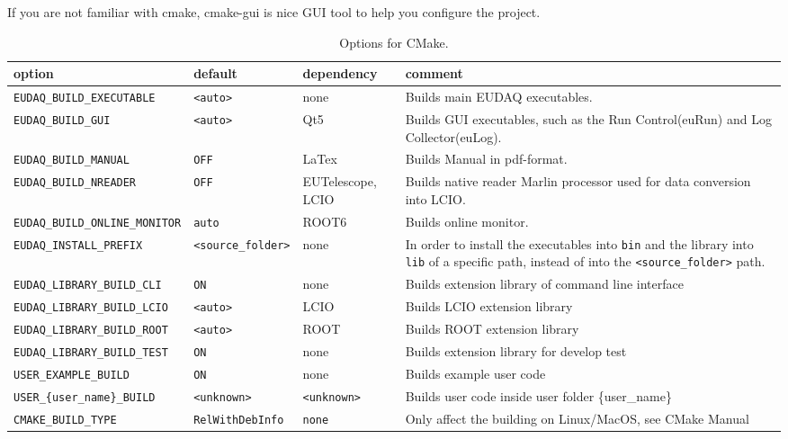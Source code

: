 If you are not familiar with cmake, cmake-gui is nice GUI tool to help you configure the project.

\begin{table}[!h]
{\footnotesize
\begin{tabular}{l|l|p{2cm}|p{5.5cm}}
option &  default &  dependency & comment \\
\hline
\texttt{EUDAQ\_BUILD\_EXECUTABLE} &  \texttt{<auto>} & none & Builds main EUDAQ executables.\\
\texttt{EUDAQ\_BUILD\_GUI} & \texttt{<auto>} & Qt5 & Builds GUI executables, such as the Run Control(euRun) and Log Collector(euLog).\\
\texttt{EUDAQ\_BUILD\_MANUAL} & \texttt{OFF} & LaTex &  Builds Manual in pdf-format.  \\
\texttt{EUDAQ\_BUILD\_NREADER} & \texttt{OFF} & EUTelescope, LCIO &  Builds native reader Marlin processor used for data conversion into LCIO.\\
\texttt{EUDAQ\_BUILD\_ONLINE\_MONITOR} & \texttt{auto} & ROOT6 &  Builds online monitor.  \\
\texttt{EUDAQ\_INSTALL\_PREFIX} & \texttt{<source\_folder>} & none & In order to install the executables into \texttt{bin} and the library into \texttt{lib} of a specific path, instead of into the \texttt{<source\_folder>} path.\\
\texttt{EUDAQ\_LIBRARY\_BUILD\_CLI} & \texttt{ON} & none & Builds extension library of command line interface\\
\texttt{EUDAQ\_LIBRARY\_BUILD\_LCIO} & \texttt{<auto>} & LCIO & Builds LCIO extension library\\
\texttt{EUDAQ\_LIBRARY\_BUILD\_ROOT} & \texttt{<auto>} & ROOT & Builds ROOT extension library\\
\texttt{EUDAQ\_LIBRARY\_BUILD\_TEST} & \texttt{ON} & none & Builds extension library for develop test\\
\texttt{USER\_EXAMPLE\_BUILD} & \texttt{ON} & none & Builds example user code\\
\texttt{USER\_\{user\_name\}\_BUILD} & \texttt{<unknown>} & \texttt{<unknown>} & Builds user code inside user folder \{user\_name\}\\
\texttt{CMAKE\_BUILD\_TYPE} & \texttt{RelWithDebInfo} & \texttt{none} & Only affect the building on Linux/MacOS, see CMake Manual\\
\end{tabular}
\caption{Options for CMake.}
\label{tab:cmakeoptions}
}
\end{table}

